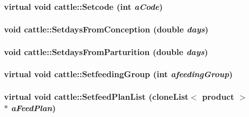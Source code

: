 \label{classcattle_a41da605e6ff1f29060cd6b67899946f1}
\hypertarget{classcattle_a36dd85ccca1fde2101b13e148951e280}{
\subsubsection[{Setcode}]{\setlength{\rightskip}{0pt plus 5cm}virtual void cattle::Setcode (int {\em aCode})}}
\label{classcattle_a36dd85ccca1fde2101b13e148951e280}
\hypertarget{classcattle_a914dbca3cb615490a696d4a63aaab37a}{
\subsubsection[{SetdaysFromConception}]{\setlength{\rightskip}{0pt plus 5cm}void cattle::SetdaysFromConception (double {\em days})}}
\label{classcattle_a914dbca3cb615490a696d4a63aaab37a}
\hypertarget{classcattle_ac2b8f179d21f9b6e11f803e68a43f607}{
\subsubsection[{SetdaysFromParturition}]{\setlength{\rightskip}{0pt plus 5cm}void cattle::SetdaysFromParturition (double {\em days})}}
\label{classcattle_ac2b8f179d21f9b6e11f803e68a43f607}
\hypertarget{classcattle_a9756ddb6e5fdf7b732690455d067bcee}{
\subsubsection[{SetfeedingGroup}]{\setlength{\rightskip}{0pt plus 5cm}virtual void cattle::SetfeedingGroup (int {\em afeedingGroup})}}
\label{classcattle_a9756ddb6e5fdf7b732690455d067bcee}
\hypertarget{classcattle_a1a2411237f113c80e1b8aff941aa937c}{
\subsubsection[{SetfeedPlanList}]{\setlength{\rightskip}{0pt plus 5cm}virtual void cattle::SetfeedPlanList ({\bf cloneList}$<$ {\bf product} $>$ $\ast$ {\em aFeedPlan})}}
